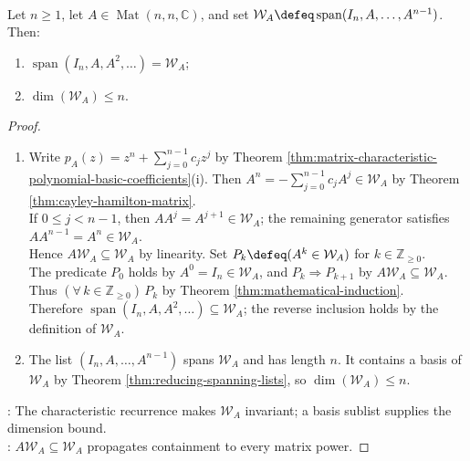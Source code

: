 \begin{corollary} \label{cor:powers-of-matrix-span-dimension-at-most-n} \\
Let $n\geq1$, let $A\in\operatorname{Mat}(n,n,\mathbb{C})$, and set $\mathcal{W}_A\defeq\operatorname{span}(I_n,A,\ldots,A^{n-1})$. Then:
\begin{enumerate}[label=(\roman*)]
\setlength{\itemsep}{0pt}
\item $\operatorname{span}(I_n,A,A^2,\ldots)=\mathcal{W}_A$;
\item $\dim(\mathcal{W}_A)\leq n$.
\end{enumerate}
\begin{proof}
\begin{enumerate}[label=(\roman*)]
\setlength{\itemsep}{0pt}
\item Write $p_A(z)=z^n+\sum\limits_{j=0}^{n-1}c_jz^j$ by Theorem \ref{thm:matrix-characteristic-polynomial-basic-coefficients}(i). Then $A^n=-\sum\limits_{j=0}^{n-1}c_jA^j\in\mathcal{W}_A$ by Theorem \ref{thm:cayley-hamilton-matrix}.\\
If $0\leq j<n-1$, then $AA^j=A^{j+1}\in\mathcal{W}_A$; the remaining generator satisfies $AA^{n-1}=A^n\in\mathcal{W}_A$.\\
Hence $A\mathcal{W}_A\subseteq\mathcal{W}_A$ by linearity. Set $P_k\defeq(A^k\in\mathcal{W}_A)$ for $k\in\mathbb{Z}_{\geq0}$.\\
The predicate $P_0$ holds by $A^0=I_n\in\mathcal{W}_A$, and $P_k\Rightarrow P_{k+1}$ by $A\mathcal{W}_A\subseteq\mathcal{W}_A$. Thus $(\forall\,k\in\mathbb{Z}_{\geq0})\,P_k$ by Theorem \ref{thm:mathematical-induction}.\\
Therefore $\operatorname{span}(I_n,A,A^2,\ldots)\subseteq\mathcal{W}_A$; the reverse inclusion holds by the definition of $\mathcal{W}_A$.
\item The list $(I_n,A,\ldots,A^{n-1})$ spans $\mathcal{W}_A$ and has length $n$. It contains a basis of $\mathcal{W}_A$ by Theorem \ref{thm:reducing-spanning-lists}, so $\dim(\mathcal{W}_A)\leq n$.
\end{enumerate}
: The characteristic recurrence makes $\mathcal{W}_A$ invariant; a basis sublist supplies the dimension bound.\\
: $A\mathcal{W}_A\subseteq\mathcal{W}_A$ propagates containment to every matrix power.
\end{proof}
\end{corollary}

